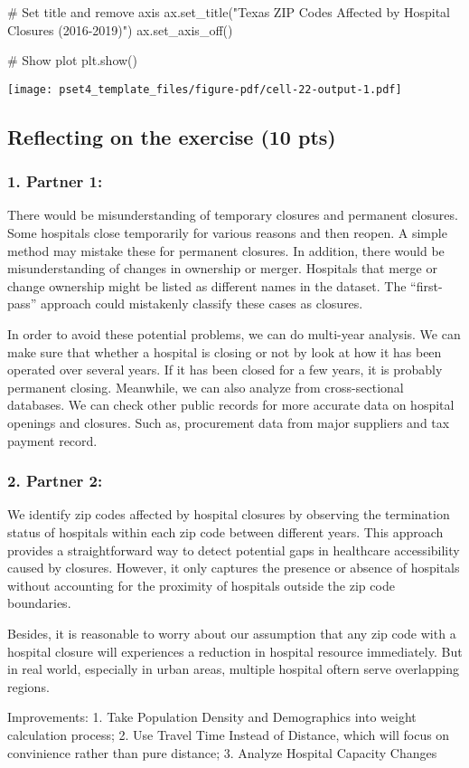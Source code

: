 \documentclass[
  letterpaper,
  DIV=11,
  numbers=noendperiod]{scrartcl}
\newenvironment{Shaded}{\begin{snugshade}}{\end{snugshade}}
\newcommand{\CommentTok}[1]{\textcolor[rgb]{0.37,0.37,0.37}{#1}}
\newcommand{\NormalTok}[1]{\textcolor[rgb]{0.00,0.23,0.31}{#1}}
\newcommand{\StringTok}[1]{\textcolor[rgb]{0.13,0.47,0.30}{#1}}
\begin{document}
\begin{Shaded}
\begin{Highlighting}[]
\CommentTok{\# Set title and remove axis}
\NormalTok{ax.set\_title(}\StringTok{"Texas ZIP Codes Affected by Hospital Closures (2016{-}2019)"}\NormalTok{)}
\NormalTok{ax.set\_axis\_off()}

\CommentTok{\# Show plot}
\NormalTok{plt.show()}
\end{Highlighting}
\end{Shaded}

\texttt{[image: pset4\_template\_files/figure-pdf/cell-22-output-1.pdf]}

\subsection{Reflecting on the exercise (10
pts)}\label{reflecting-on-the-exercise-10-pts}

\subsubsection{1. Partner 1:}\label{partner-1}

There would be misunderstanding of temporary closures and permanent
closures. Some hospitals close temporarily for various reasons and then
reopen. A simple method may mistake these for permanent closures. In
addition, there would be misunderstanding of changes in ownership or
merger. Hospitals that merge or change ownership might be listed as
different names in the dataset. The ``first-pass'' approach could
mistakenly classify these cases as closures.

In order to avoid these potential problems, we can do multi-year
analysis. We can make sure that whether a hospital is closing or not by
look at how it has been operated over several years. If it has been
closed for a few years, it is probably permanent closing. Meanwhile, we
can also analyze from cross-sectional databases. We can check other
public records for more accurate data on hospital openings and closures.
Such as, procurement data from major suppliers and tax payment record.

\subsubsection{2. Partner 2:}\label{partner-2}

We identify zip codes affected by hospital closures by observing the
termination status of hospitals within each zip code between different
years. This approach provides a straightforward way to detect potential
gaps in healthcare accessibility caused by closures. However, it only
captures the presence or absence of hospitals without accounting for the
proximity of hospitals outside the zip code boundaries.

Besides, it is reasonable to worry about our assumption that any zip
code with a hospital closure will experiences a reduction in hospital
resource immediately. But in real world, especially in urban areas,
multiple hospital oftern serve overlapping regions.

Improvements: 1. Take Population Density and Demographics into weight
calculation process; 2. Use Travel Time Instead of Distance, which will
focus on convinience rather than pure distance; 3. Analyze Hospital
Capacity Changes
\end{document}
